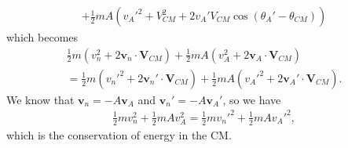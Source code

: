 \documentclass[11pt]{article}
\renewcommand\vec{\mathbf}
\begin{document}
\begin{enumerate}
\begin{align}
+ \frac{1}{2}mA (v_A'^2 + V_{CM}^2 + 2 v_A' V_{CM} \cos(\theta_A'-\theta_{CM})) 
\end{align}
which becomes
\begin{align}
  \frac{1}{2} m (v_n^2 + 2 \vec{v}_n \cdot \vec{V}_{CM} ) 
+ \frac{1}{2}mA (v_A^2 + 2 \vec{v}_A \cdot \vec{V}_{CM}) \\
= \frac{1}{2} m (v_n'^2 + 2 \vec{v}_n' \cdot \vec{V}_{CM})
+ \frac{1}{2}mA (v_A'^2 + 2 \vec{v}_A' \cdot \vec{V}_{CM}) .
\end{align}
We know that \(\vec{v}_n = -A \vec{v}_A\) and \(\vec{v}_n' = -A \vec{v}_A'\), so we have
\begin{align}
  \frac{1}{2} m v_n^2
+ \frac{1}{2}mA v_A^2
= \frac{1}{2} m v_n'^2
+ \frac{1}{2}mA v_A'^2,
\end{align}
which is the conservation of energy in the CM.
\end{enumerate}
\end{document}
